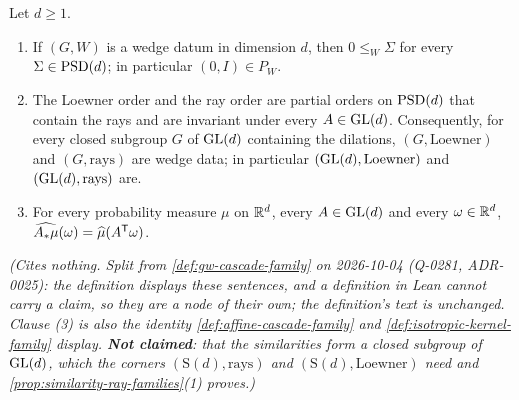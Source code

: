 \begin{lemma}
\label{lem:gw-scheme-claims}
\leanok
Let $d \ge 1$.
\begin{enumerate}
\item If $(G, W)$ is a wedge datum in dimension $d$, then $0 \le_W \Sigma$ for every
$\Sigma \in \mathrm{PSD}(d)$; in particular $(0, I) \in P_W$.
\item The Loewner order and the ray order are partial orders on $\mathrm{PSD}(d)$ that contain the rays
and are invariant under every $A \in \mathrm{GL}(d)$. Consequently, for every closed subgroup $G$ of
$\mathrm{GL}(d)$ containing the dilations, $(G, \text{Loewner})$ and $(G, \text{rays})$ are wedge data; in
particular $(\mathrm{GL}(d), \text{Loewner})$ and $(\mathrm{GL}(d), \text{rays})$ are.
\item For every probability measure $\mu$ on $\mathbb{R}^d$, every $A \in \mathrm{GL}(d)$ and every
$\omega \in \mathbb{R}^d$, $\widehat{A_*\mu}(\omega) = \widehat\mu(A^{\mathsf{T}}\omega)$.
\end{enumerate}
\statusT\quad\emph{(Cites nothing. Split from \ref{def:gw-cascade-family} on 2026-10-04 (Q-0281,
ADR-0025): the definition displays these sentences, and a definition in Lean cannot carry a claim,
so they are a node of their own; the definition's text is unchanged. Clause (3) is also the identity
\ref{def:affine-cascade-family} and \ref{def:isotropic-kernel-family} display. \textbf{Not
claimed}: that the similarities form a closed subgroup of $\mathrm{GL}(d)$, which the corners
$(\mathrm S(d), \text{rays})$ and $(\mathrm S(d), \text{Loewner})$ need and
\ref{prop:similarity-ray-families}(1) proves.)}
\end{lemma}

